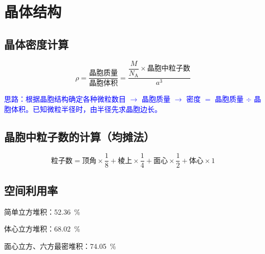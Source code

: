     \section{晶体结构}\label{app:公式-晶体}

        \subsection{晶体密度计算}

            \[
                \rho = \frac{\text{晶胞质量}}{\text{晶胞体积}}
                = \frac{\dfrac{M}{N_\text{A}} \times \text{晶胞中粒子数}}{a^3}
            \]

            \textcolor{blue}{思路：根据晶胞结构确定各种微粒数目 \(\to\) 晶胞质量 \(\to\) 密度 \(=\) 晶胞质量 \(\div\) 晶胞体积。已知微粒半径时，由半径先求晶胞边长。}

        \subsection{晶胞中粒子数的计算（均摊法）}

            \[
                \text{粒子数} = \text{顶角} \times \frac{1}{8} + \text{棱上} \times \frac{1}{4} + \text{面心} \times \frac{1}{2} + \text{体心} \times 1
            \]

        \subsection{空间利用率}

            \begin{datas}
                \item 简单立方堆积：\SI{52.36}{\percent}
                \item 体心立方堆积：\SI{68.02}{\percent}
                \item 面心立方、六方最密堆积：\SI{74.05}{\percent}
            \end{datas}
